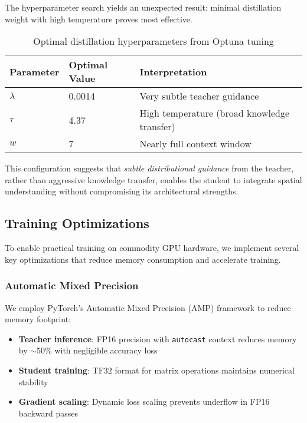 The hyperparameter search yields an unexpected result: minimal distillation weight with high temperature proves most effective.

\begin{table}[h]
\centering
\caption{Optimal distillation hyperparameters from Optuna tuning}
\label{tab:optimal-hparams}
\small
\begin{tabular}{lll}
\toprule
\textbf{Parameter} & \textbf{Optimal Value} & \textbf{Interpretation} \\
\midrule
$\lambda$ & 0.0014 & Very subtle teacher guidance \\
$\tau$ & 4.37 & High temperature (broad knowledge transfer) \\
$w$ & 7 & Nearly full context window \\
\bottomrule
\end{tabular}
\end{table}

This configuration suggests that \emph{subtle distributional guidance} from the teacher, rather than aggressive knowledge transfer, enables the student to integrate spatial understanding without compromising its architectural strengths.

\subsection{Training Optimizations}
\label{sec:impl-opt}

To enable practical training on commodity GPU hardware, we implement several key optimizations that reduce memory consumption and accelerate training.

\subsubsection{Automatic Mixed Precision}

We employ PyTorch's Automatic Mixed Precision (AMP) framework to reduce memory footprint:

\begin{itemize}[noitemsep,topsep=0pt]
\item \textbf{Teacher inference}: FP16 precision with \texttt{autocast} context reduces memory by $\sim$50\% with negligible accuracy loss
\item \textbf{Student training}: TF32 format for matrix operations maintains numerical stability
\item \textbf{Gradient scaling}: Dynamic loss scaling prevents underflow in FP16 backward passes
\end{itemize}


